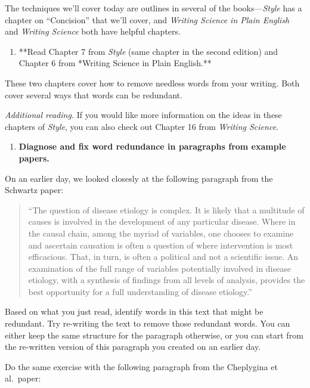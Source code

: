 \documentclass[]{tufte-book}
\providecommand{\tightlist}{%
  \setlength{\itemsep}{0pt}\setlength{\parskip}{0pt}}
\begin{document}
The techniques we'll cover today are outlines in several of the books---\emph{Style} has
a chapter on ``Concision'' that we'll cover, and \emph{Writing Science in Plain English} and
\emph{Writing Science} both have helpful chapters.

\begin{enumerate}
\def\labelenumi{\arabic{enumi}.}
\tightlist
\item
  **Read Chapter 7 from \emph{Style} (same chapter in the second edition) and Chapter 6 from *Writing Science in Plain English.**
\end{enumerate}

These two chapters cover how to remove needless words from your writing. Both cover
several ways that words can be redundant.

\emph{Additional reading.} If you would like more information on the ideas in these
chapters of \emph{Style}, you can also check out Chapter 16 from \emph{Writing Science}.

\begin{enumerate}
\def\labelenumi{\arabic{enumi}.}
\setcounter{enumi}{1}
\tightlist
\item
  \textbf{Diagnose and fix word redundance in paragraphs from example papers.}
\end{enumerate}

On an earlier day, we looked closesly at the following paragraph from the Schwartz
paper:

\begin{quote}
``The question of disease etiology is complex. It is likely that a multitude of
causes is involved in the development of any particular disease. Where in the
causal chain, among the myriad of variables, one chooses to examine and
ascertain causation is often a question of where intervention is most
efficacious. That, in turn, is often a political and not a scientific issue. An
examination of the full range of variables potentially involved in disease
etiology, with a synthesis of findings from all levels of analysis, provides the
best opportunity for a full understanding of disease etiology.''
\end{quote}

Based on what you just read, identify words in this text that might be redundant.
Try re-writing the text to remove those redundant words. You can either keep the
same structure for the paragraph otherwise, or you can start from the re-written
version of this paragraph you created on an earlier day.

Do the same exercise with the following paragraph from the Cheplygina et al.~paper:
\end{document}
